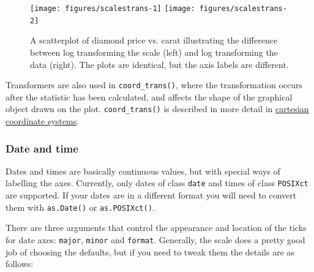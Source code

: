 \begin{Shaded}
\begin{Highlighting}[]
\NormalTok{(} 
 \StringTok{ }
\StringTok{  }\NormalTok{() +}\StringTok{ }\NormalTok{()}
\end{Highlighting}
\end{Shaded}

\begin{figure}
\texttt{[image: figures/scalestrans-1]} \texttt{[image: figures/scalestrans-2]} \caption{A scatterplot of diamond price vs. carat illustrating the difference between log transforming the scale (left) and log transforming the data (right).  The plots are identical, but the axis labels are different.\label{fig:trans}}
\end{figure}

Transformers are also used in \texttt{coord\_trans()}, where the
transformation occurs after the statistic has been calculated, and
affects the shape of the graphical object drawn on the plot.
\texttt{coord\_trans()} is described in more detail in
\hyperref[sub:cartesian]{cartesian coordinate systems}.

\subsubsection{Date and time}\label{ssub:scale-date}

Dates and times are basically continuous values, but with special ways
of labelling the axes. Currently, only dates of class \texttt{date} and
times of class \texttt{POSIXct} are supported. If your dates are in a
different format you will need to convert them with \texttt{as.Date()}
or \texttt{as.POSIXct()}.  
 

There are three arguments that control the appearance and location of
the ticks for date axes: \texttt{major}, \texttt{minor} and
\texttt{format}. Generally, the scale does a pretty good job of choosing
the defaults, but if you need to tweak them the details are as follows:

